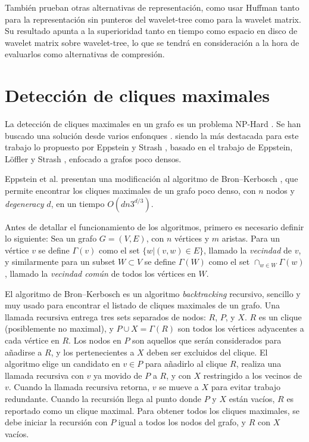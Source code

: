 

También prueban otras alternativas de representación, como usar Huffman \cite{huffman1952method} tanto para la representación sin punteros del wavelet-tree como para la wavelet matrix. Su resultado apunta a la superioridad tanto en tiempo como espacio en disco de wavelet matrix sobre wavelet-tree, lo que se tendrá en consideración a la hora de evaluarlos como alternativas de compresión.



\section{Detección de cliques maximales} \label{sec:Cliques}
La detección de cliques maximales en un grafo es un problema NP-Hard \cite{karp1972reducibility}. Se han buscado una solución desde varios enfonques \cite{bron1973algorithm, eblen2012maximum, hendrix2010theoretical, bomze1999maximum, eppstein2010listing, eppstein2011listing}. siendo la más destacada para este trabajo lo propuesto por Eppstein y Strash \cite{eppstein2011listing}, basado en el trabajo de Eppstein, Löffler y Strash \cite{eppstein2010listing}, enfocado a grafos poco densos.

Eppstein et al. \cite{eppstein2010listing} presentan una modificación al algoritmo de Bron–Kerbosch \cite{bron1973algorithm}, que permite encontrar los cliques maximales de un grafo poco denso, con $n$ nodos y \textit{degeneracy} $d$, en un tiempo $O(dn3^{d/3})$.

Antes de detallar el funcionamiento de los algoritmos, primero es necesario definir lo siguiente: Sea un grafo $G = (V, E)$, con $n$ vértices y $m$ aristas. Para un vértice $v$ se define $\Gamma(v)$ como el set $\{w | (v, w) \in E\}$, llamado la \textit{vecindad} de $v$, y similarmente para un subset $W \subset V$ se define $\Gamma(W)$ como el set $\cap_{w \in W} \Gamma(w)$, llamado la \textit{vecindad común} de todos los vértices en $W$.

El algoritmo de Bron–Kerbosch \cite{bron1973algorithm} es un algoritmo \textit{backtracking} recursivo, sencillo y muy usado para encontrar el listado de cliques maximales de un grafo. Una llamada recursiva entrega tres sets separados de nodos: $R$, $P$, y $X$. $R$ es un clique (posiblemente no maximal), y $P \cup X = \Gamma(R)$ son todos los vértices adyacentes a cada vértice en $R$. Los nodos en $P$ son aquellos que serán considerados para añadirse a $R$, y los pertenecientes a $X$ deben ser excluidos del clique. El algoritmo elige un candidato en $v \in P$ para añadirlo al clique $R$, realiza una llamada recursiva con $v$ ya movido de $P$ a $R$, y con $X$ restringido a los vecinos de $v$. Cuando la llamada recursiva retorna, $v$ se mueve a $X$ para evitar trabajo redundante. Cuando la recursión llega al punto donde $P$ y $X$ están vacíos, $R$ es reportado como un clique maximal. Para obtener todos los cliques maximales, se debe iniciar la recursión con $P$ igual a todos los nodos del grafo, y $R$ con $X$ vacíos.

